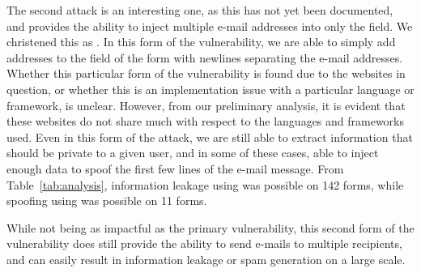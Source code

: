     The second attack is an interesting one, as this has not yet been documented, and provides the ability to inject multiple e-mail addresses into only the  field. We christened this as . In this form of the vulnerability, we are able to simply add addresses to the  field of the form with newlines separating the e-mail addresses. Whether this particular form of the vulnerability is found due to the websites in question, or whether this is an implementation issue with a particular language or framework, is unclear. However, from our preliminary analysis, it is evident that these websites do not share much with respect to the languages and frameworks used. 
    Even in this form of the attack, we are still able to extract information that should be private to a given user, and in some of these cases, able to inject enough data to spoof the first few lines of the e-mail message. From Table~\ref{tab:analysis}, information leakage using  was possible on 142 forms, while spoofing using  was possible on 11 forms.
    
    While not being as impactful as the primary vulnerability, this second form of the vulnerability does still provide the ability to send e-mails to multiple recipients, and can easily result in information leakage or spam generation on a large scale.
    
